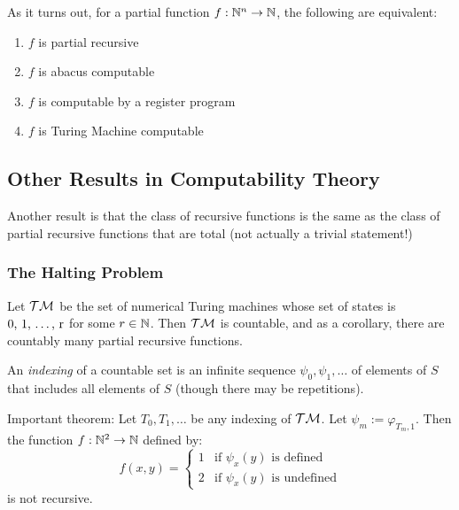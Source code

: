 As it turns out, for a partial function $ f: \mathbb{N}^n \to \mathbb{N} $, the following are equivalent:

\begin{enumerate}
	\item $ f $ is partial recursive
	\item $ f $ is abacus computable
	\item $ f $ is computable by a register program
	\item $ f $ is Turing Machine computable
\end{enumerate}



\subsection{Other Results in Computability Theory}

Another result is that the class of recursive functions is the same as the class of partial recursive functions that are total (not actually a trivial statement!)

\subsubsection{The Halting Problem}

Let $ \mathcal{TM} $ be the set of numerical Turing machines whose set of states is $ \text{0, 1, \dots, r} $ for some $ r \in \mathbb{N} $. Then $ \mathcal{TM} $ is countable, and as a corollary, there are countably many partial recursive functions.

An \textit{indexing} of a countable set is an infinite sequence $ \psi_0, \psi_1, \dots $ of elements of $ S $ that includes all elements of $ S $ (though there may be repetitions).

Important theorem: Let $ T_0, T_1, \dots $ be any indexing of $ \mathcal{TM} $. Let $ \psi_m := \varphi_{T_m, 1} $. Then the function $ f: \mathbb{N}^2 \to \mathbb{N} $ defined by:
\begin{equation*}
f(x, y) = \begin{cases}
1 &\text{if } \psi_x(y) \text{ is defined}\\
2 &\text{if } \psi_x(y) \text{ is undefined}
\end{cases}
\end{equation*}
is not recursive.

